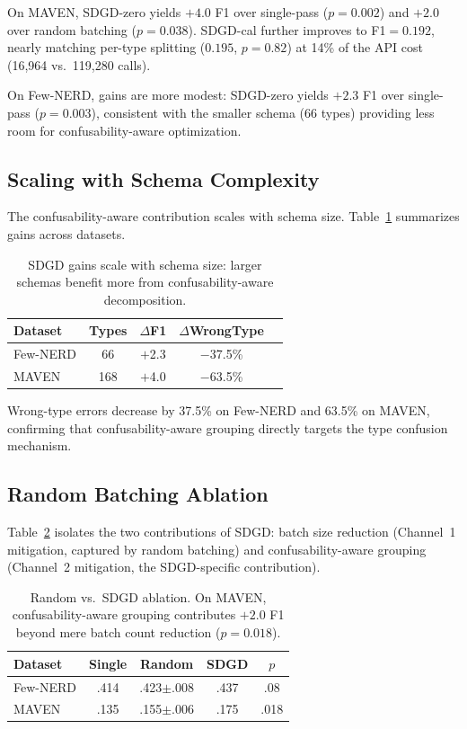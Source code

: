 \documentclass[11pt,a4paper]{article}
\begin{document}
On MAVEN, SDGD-zero yields $+4.0$ F1 over single-pass ($p=0.002$) and $+2.0$ over random batching ($p=0.038$). SDGD-cal further improves to F1$=0.192$, nearly matching per-type splitting ($0.195$, $p=0.82$) at 14\% of the API cost (16,964 vs.\ 119,280 calls).

On Few-NERD, gains are more modest: SDGD-zero yields $+2.3$ F1 over single-pass ($p=0.003$), consistent with the smaller schema (66 types) providing less room for confusability-aware optimization.

\subsection{Scaling with Schema Complexity}

The confusability-aware contribution scales with schema size. Table~\ref{tab:cross_dataset_gain} summarizes gains across datasets.

\begin{table}[t]
\centering
\small
\caption{SDGD gains scale with schema size: larger schemas benefit more from confusability-aware decomposition.}
\label{tab:cross_dataset_gain}
\begin{tabular}{lcccc}
\toprule
Dataset & Types & $\Delta$F1 & $\Delta$WrongType \\
\midrule
Few-NERD & 66 & $+$2.3 & $-$37.5\% \\
MAVEN & 168 & $+$4.0 & $-$63.5\% \\
\bottomrule
\end{tabular}
\end{table}

Wrong-type errors decrease by 37.5\% on Few-NERD and 63.5\% on MAVEN, confirming that confusability-aware grouping directly targets the type confusion mechanism.

\subsection{Random Batching Ablation}

Table~\ref{tab:ablation_random} isolates the two contributions of SDGD: batch size reduction (Channel~1 mitigation, captured by random batching) and confusability-aware grouping (Channel~2 mitigation, the SDGD-specific contribution).

\begin{table}[t]
\centering
\small
\caption{Random vs.\ SDGD ablation. On MAVEN, confusability-aware grouping contributes $+2.0$ F1 beyond mere batch count reduction ($p=0.018$).}
\label{tab:ablation_random}
\begin{tabular}{lcccc}
\toprule
Dataset & Single & Random & SDGD & $p$ \\
\midrule
Few-NERD & .414 & .423$\pm$.008 & .437 & .08 \\
MAVEN & .135 & .155$\pm$.006 & .175 & .018 \\
\bottomrule
\end{tabular}
\end{table}
\end{document}
